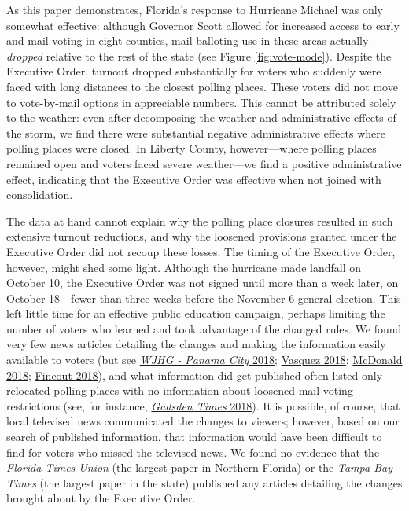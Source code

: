\documentclass[
  12pt,
]{article}
\begin{document}
As this paper demonstrates, Florida's response to Hurricane Michael was only somewhat effective: although Governor Scott allowed for increased access to early and mail voting in eight counties, mail balloting use in these areas actually \emph{dropped} relative to the rest of the state (see Figure \ref{fig:vote-mode}). Despite the Executive Order, turnout dropped substantially for voters who suddenly were faced with long distances to the closest polling places. These voters did not move to vote-by-mail options in appreciable numbers. This cannot be attributed solely to the weather: even after decomposing the weather and administrative effects of the storm, we find there were substantial negative administrative effects where polling places were closed. In Liberty County, however---where polling places remained open and voters faced severe weather---we find a positive administrative effect, indicating that the Executive Order was effective when not joined with consolidation.

The data at hand cannot explain why the polling place closures resulted in such extensive turnout reductions, and why the loosened provisions granted under the Executive Order did not recoup these losses. The timing of the Executive Order, however, might shed some light. Although the hurricane made landfall on October 10, the Executive Order was not signed until more than a week later, on October 18---fewer than three weeks before the November 6 general election. This left little time for an effective public education campaign, perhaps limiting the number of voters who learned and took advantage of the changed rules. We found very few news articles detailing the changes and making the information easily available to voters (but see \protect\hyperlink{ref-WJHG2018}{\emph{WJHG - Panama City} 2018}; \protect\hyperlink{ref-Vasquez2018}{Vasquez 2018}; \protect\hyperlink{ref-McDonald2018}{McDonald 2018}; \protect\hyperlink{ref-Fineout2018}{Fineout 2018}), and what information did get published often listed only relocated polling places with no information about loosened mail voting restrictions (see, for instance, \protect\hyperlink{ref-gadsdentimes2018}{\emph{Gadsden Times} 2018}). It is possible, of course, that local televised news communicated the changes to viewers; however, based on our search of published information, that information would have been difficult to find for voters who missed the televised news. We found no evidence that the \emph{Florida Times-Union} (the largest paper in Northern Florida) or the \emph{Tampa Bay Times} (the largest paper in the state) published any articles detailing the changes brought about by the Executive Order.
\end{document}
